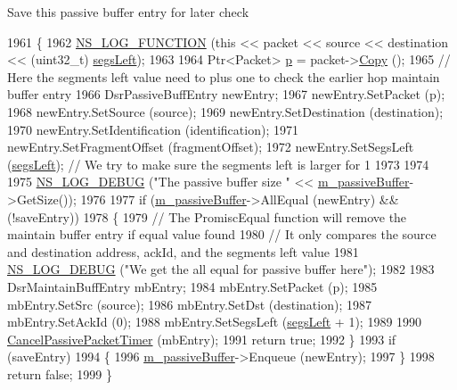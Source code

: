 Save this passive buffer entry for later check 
\begin{DoxyCode}
1961 \{
1962   \hyperlink{log-macros-disabled_8h_a90b90d5bad1f39cb1b64923ea94c0761}{NS\_LOG\_FUNCTION} (\textcolor{keyword}{this} << packet << source << destination << (uint32\_t)
      \hyperlink{classns3_1_1dsr_1_1DsrRouting_a2089307bfbe378b6cd8b274b38f70bb9}{segsLeft});
1963 
1964   Ptr<Packet> \hyperlink{lte__link__budget_8m_ac9de518908a968428863f829398a4e62}{p} = packet->\hyperlink{classns3_1_1Packet_a5d5c70802a5f77fc5f0001e0cfc1898b}{Copy} ();
1965   \textcolor{comment}{// Here the segments left value need to plus one to check the earlier hop maintain buffer entry}
1966   DsrPassiveBuffEntry newEntry;
1967   newEntry.SetPacket (p);
1968   newEntry.SetSource (source);
1969   newEntry.SetDestination (destination);
1970   newEntry.SetIdentification (identification);
1971   newEntry.SetFragmentOffset (fragmentOffset);
1972   newEntry.SetSegsLeft (\hyperlink{classns3_1_1dsr_1_1DsrRouting_a2089307bfbe378b6cd8b274b38f70bb9}{segsLeft});  \textcolor{comment}{// We try to make sure the segments left is larger for 1}
1973 
1974 
1975   \hyperlink{group__logging_ga413f1886406d49f59a6a0a89b77b4d0a}{NS\_LOG\_DEBUG} (\textcolor{stringliteral}{"The passive buffer size "} << \hyperlink{classns3_1_1dsr_1_1DsrRouting_ac0404985fc04df7f5b8f53ff1e487079}{m\_passiveBuffer}->GetSize());
1976 
1977   \textcolor{keywordflow}{if} (\hyperlink{classns3_1_1dsr_1_1DsrRouting_ac0404985fc04df7f5b8f53ff1e487079}{m\_passiveBuffer}->AllEqual (newEntry) && (!saveEntry))
1978     \{
1979       \textcolor{comment}{// The PromiscEqual function will remove the maintain buffer entry if equal value found}
1980       \textcolor{comment}{// It only compares the source and destination address, ackId, and the segments left value}
1981       \hyperlink{group__logging_ga413f1886406d49f59a6a0a89b77b4d0a}{NS\_LOG\_DEBUG} (\textcolor{stringliteral}{"We get the all equal for passive buffer here"});
1982 
1983       DsrMaintainBuffEntry mbEntry;
1984       mbEntry.SetPacket (p);
1985       mbEntry.SetSrc (source);
1986       mbEntry.SetDst (destination);
1987       mbEntry.SetAckId (0);
1988       mbEntry.SetSegsLeft (\hyperlink{classns3_1_1dsr_1_1DsrRouting_a2089307bfbe378b6cd8b274b38f70bb9}{segsLeft} + 1);
1989 
1990       \hyperlink{classns3_1_1dsr_1_1DsrRouting_aee6495417f54a12f484029ee1a445d64}{CancelPassivePacketTimer} (mbEntry);
1991       \textcolor{keywordflow}{return} \textcolor{keyword}{true};
1992     \}
1993   \textcolor{keywordflow}{if} (saveEntry)
1994     \{
1996       \hyperlink{classns3_1_1dsr_1_1DsrRouting_ac0404985fc04df7f5b8f53ff1e487079}{m\_passiveBuffer}->Enqueue (newEntry);
1997     \}
1998   \textcolor{keywordflow}{return} \textcolor{keyword}{false};
1999 \}
\end{DoxyCode}



